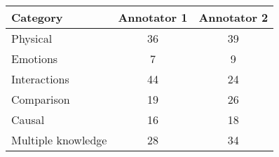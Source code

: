 
\begin{tabular}{ | l | c | c | }
    \hline
    \textbf{Category}  & \textbf{Annotator 1}  & \textbf{Annotator 2} \\ \hline
    Physical & 36 & 39 \\\hline
    Emotions & 7 & 9 \\\hline
    Interactions & 44 & 24 \\\hline
    Comparison & 19 & 26 \\\hline
    Causal & 16 & 18 \\\hline
    Multiple knowledge & 28 & 34\\\hline
\end{tabular}

